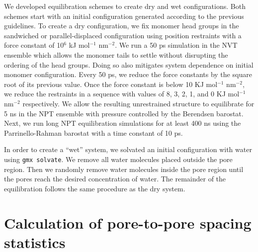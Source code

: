 \documentclass[journal=jpcbfk,manusciprt=article]{achemso}
\begin{document}
  We developed equilibration schemes to create dry and wet configurations. Both
  schemes start with an initial configuration generated according to the previous
  guidelines. To create a dry configuration, we fix monomer head groups in the
  sandwiched or parallel-displaced configuration using position restraints with a
  force constant of 10$^6$ kJ mol$^{-1}$ nm$^{-2}$. We run a 50 ps simulation in
  the NVT ensemble which allows the monomer tails to settle without disrupting
  the ordering of the head groups. Doing so also mitigates system dependence on
  initial monomer configuration. Every 50 ps, we reduce the force constants by
  the square root of its previous value. Once the force constant is below 10 KJ
  mol$^{-1}$ nm$^{-2}$, we reduce the restraints in a sequence with values of
  8, 3, 2, 1, and 0 KJ mol$^{-1}$ nm$^{-2}$ respectively. We allow the resulting
  unrestrained structure to equilibrate for 5 ns in the NPT ensemble
  with pressure controlled by the Berendsen barostat. Next, we run long NPT
  equilibration simulations for at least 400 ns using the Parrinello-Rahman
  barostat with a time constant of 10 ps.

  In order to create a ``wet'' system, we solvated an initial configuration with
  water using \texttt{gmx solvate}. We remove all water molecules placed outside
  the pore region. Then we randomly remove water molecules inside the pore region
  until the pores reach the desired concentration of water. The remainder of the
  equilibration follows the same procedure as the dry system. 

  \section{Calculation of pore-to-pore spacing statistics}\label{section:p2p_stats}
 
\end{document}
